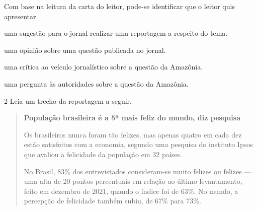 \begin{escolha}
\begin{escolha}
\begin{escolha}
{\begin{quote}
\end{quote}

Com base na leitura da carta do leitor, pode-se identificar que o leitor
quis apresentar

\begin{escolha}
\item uma sugestão para o jornal realizar uma reportagem a respeito do tema.

\item uma opinião sobre uma questão publicada no jornal.

\item uma crítica ao veículo jornalístico sobre a questão da Amazônia.

\item uma pergunta às autoridades sobre a questão da Amazônia.
\end{escolha}


\num{2} Leia um trecho da reportagem a seguir.

\begin{quote}
\textbf{População brasileira é a 5ª mais feliz do mundo, diz pesquisa}

Os brasileiros nunca foram tão felizes, mas apenas quatro em cada dez
estão satisfeitos com a economia, segundo uma pesquisa do instituto
Ipsos que avaliou a felicidade da população em 32 países.

No Brasil, 83\% dos entrevistados consideram-se muito felizes ou felizes
--- uma alta de 20 pontos percentuais em relação ao último levantamento,
feito em dezembro de 2021, quando o índice foi de 63\%. No mundo, a
percepção de felicidade também subiu, de 67\% para 73\%.


\end{quote}}
\end{escolha}
\end{escolha}
\end{escolha}

